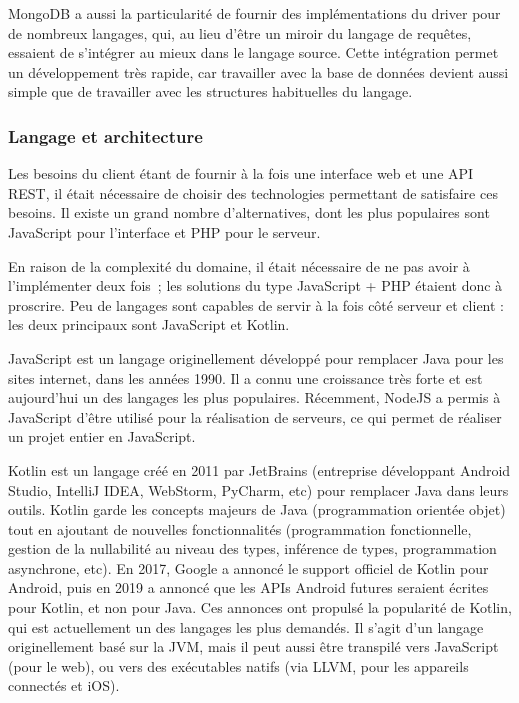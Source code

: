 \documentclass[11pt,french]{memoir}
\begin{document}
	\uparagraph
	MongoDB a aussi la particularité de fournir des implémentations du driver pour de nombreux langages, qui, au lieu d’être un miroir du langage de requêtes, essaient de s’intégrer au mieux dans le langage source.
	Cette intégration permet un développement très rapide, car travailler avec la base de données devient aussi simple que de travailler avec les structures habituelles du langage.

	\subsubsection{Langage et architecture}

	Les besoins du client étant de fournir à la fois une interface web et une API REST, il était nécessaire de choisir des technologies permettant de satisfaire ces besoins.
	Il existe un grand nombre d’alternatives, dont les plus populaires sont JavaScript pour l’interface et PHP pour le serveur.

	En raison de la complexité du domaine, il était nécessaire de ne pas avoir à l’implémenter deux fois~;
	les solutions du type JavaScript + PHP étaient donc à proscrire.
	Peu de langages sont capables de servir à la fois côté serveur et client : les deux principaux sont JavaScript et Kotlin.

	\uparagraph
	JavaScript est un langage originellement développé pour remplacer Java pour les sites internet, dans les années 1990.
	Il a connu une croissance très forte et est aujourd’hui un des langages les plus populaires.
	Récemment, NodeJS a permis à JavaScript d’être utilisé pour la réalisation de serveurs, ce qui permet de réaliser un projet entier en JavaScript.

	Kotlin est un langage créé en 2011 par JetBrains (entreprise développant Android Studio, IntelliJ IDEA, WebStorm, PyCharm, etc) pour remplacer Java dans leurs outils.
	Kotlin garde les concepts majeurs de Java (programmation orientée objet) tout en ajoutant de nouvelles fonctionnalités (programmation fonctionnelle, gestion de la nullabilité au niveau des types, inférence de types, programmation asynchrone, etc).
	En 2017, Google a annoncé le support officiel de Kotlin pour Android, puis en 2019 a annoncé que les APIs Android futures seraient écrites pour Kotlin, et non pour Java.
	Ces annonces ont propulsé la popularité de Kotlin, qui est actuellement un des langages les plus demandés.
	Il s’agit d’un langage originellement basé sur la JVM, mais il peut aussi être transpilé vers JavaScript (pour le web), ou vers des exécutables natifs (via LLVM, pour les appareils connectés et iOS).
\end{document}
